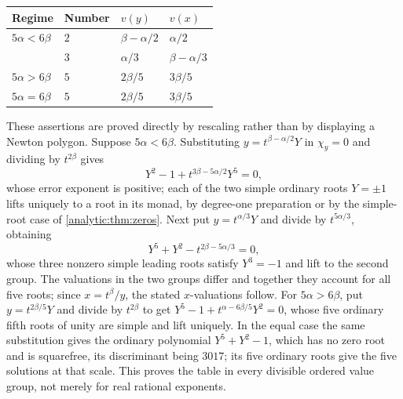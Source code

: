 \documentclass[11pt,letterpaper]{article}
\theoremstyle{definition}
\theoremstyle{remark}
\numberwithin{equation}{section}
\begin{document}
\begin{center}
\begin{tabular}{@{}L{0.22\textwidth}L{0.12\textwidth}L{0.24\textwidth}L{0.24\textwidth}@{}}
\toprule
Regime & Number & $v(y)$ & $v(x)$\\
\midrule
$5\alpha<6\beta$ & $2$ & $\beta-\alpha/2$ & $\alpha/2$\\[0.3em]
                 & $3$ & $\alpha/3$ & $\beta-\alpha/3$\\[0.3em]
$5\alpha>6\beta$ & $5$ & $2\beta/5$ & $3\beta/5$\\[0.3em]
$5\alpha=6\beta$ & $5$ & $2\beta/5$ & $3\beta/5$\\
\bottomrule
\end{tabular}
\end{center}

These assertions are proved directly by rescaling rather than by displaying
a Newton polygon. Suppose $5\alpha<6\beta$. Substituting
$y=t^{\beta-\alpha/2}Y$ in $\chi_y=0$ and dividing by $t^{2\beta}$ gives
\[
 Y^2-1+t^{3\beta-5\alpha/2}Y^5=0,
\]
whose error exponent is positive; each of the two simple ordinary roots
$Y=\pm1$ lifts uniquely to a root in its monad, by degree-one preparation or
by the simple-root case of \cref{analytic:thm:zeros}. Next put
$y=t^{\alpha/3}Y$ and divide by $t^{5\alpha/3}$, obtaining
\[
 Y^5+Y^2-t^{2\beta-5\alpha/3}=0,
\]
whose three nonzero simple leading roots satisfy $Y^3=-1$ and lift to the
second group. The valuations in the two groups differ and together they
account for all five roots; since $x=t^\beta/y$, the stated $x$-valuations
follow. For $5\alpha>6\beta$, put $y=t^{2\beta/5}Y$ and divide by
$t^{2\beta}$ to get $Y^5-1+t^{\alpha-6\beta/5}Y^2=0$, whose five ordinary
fifth roots of unity are simple and lift uniquely. In the equal case the
same substitution gives the ordinary polynomial $Y^5+Y^2-1$, which has no
zero root and is squarefree, its discriminant being $3017$; its five
ordinary roots give the five solutions at that scale. This proves the table
in every divisible ordered value group, not merely for real rational
exponents.
\end{document}
